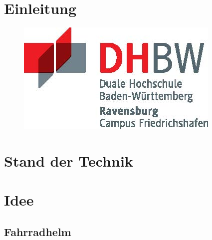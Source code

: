 \documentclass[a4paper, 12pt]{article} %
\begin{document}
\clearpage

\section{Einleitung}


\begin{spacing}{1.8}  %
\fontsize{14pt}{15pt}\selectfont  %

\begin{figure}[H]
    \includegraphics[width=0.5\linewidth]{images/DHBW_d_R_FN_46mm_4c.jpg}\\[1ex] 
    \centering
    \caption{}
    \label{ABBILDUNG 1}
\end{figure}

\end{spacing}

\clearpage

\section{Stand der Technik}


\begin{spacing}{1.8}  %
\fontsize{14pt}{15pt}\selectfont  %


\end{spacing}

\clearpage

\section{Idee}


\begin{spacing}{1.8}  %
\fontsize{14pt}{15pt}\selectfont  %


\end{spacing}

\clearpage

\subsection{Fahrradhelm}
\end{document}
